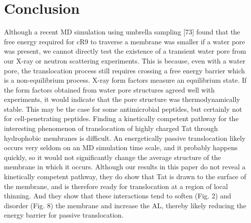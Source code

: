 \section{Conclusion}
Although a recent MD simulation using umbrella sampling [73] found that the 
free
energy required for cR9 to traverse a membrane was smaller if a water pore was 
present, we
cannot directly test the existence of a transient water pore from our X-ray or 
neutron scattering
experiments. This is because, even with a water pore, the translocation process 
still requires
crossing a free energy barrier which is a non-equilibrium process. X-ray form 
factors measure
an equilibrium state. If the form factors obtained from water pore structures 
agreed well with
experiments, it would indicate that the pore structure was thermodynamically 
stable. This may
be the case for some antimicrobial peptides, but certainly not for 
cell-penetrating peptides.
Finding a kinetically competent pathway for the interesting phenomenon of 
translocation
of highly charged Tat through hydrophobic membranes is difficult. An 
energetically passive
translocation likely occurs very seldom on an MD simulation time scale, and 
it probably happens
quickly, so it would not significantly change the average structure of the 
membrane in which it
occurs. Although our results in this paper do not reveal a kinetically competent 
pathway, they do
show that Tat is drawn to the surface of the membrane, and is therefore ready 
for translocation at
a region of local thinning. And they show that these interactions tend to 
soften (Fig. 2) and
disorder (Fig. 8) the membrane and increase the AL, thereby likely reducing 
the energy barrier
for passive translocation.

